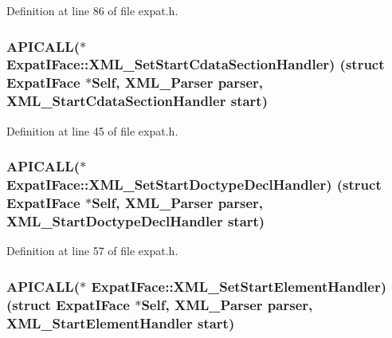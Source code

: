 Definition at line 86 of file expat.\+h.

\subsubsection[{\texorpdfstring{X\+M\+L\+\_\+\+Set\+Start\+Cdata\+Section\+Handler}{XML_SetStartCdataSectionHandler}}]{ A\+P\+I\+C\+A\+LL($\ast$ Expat\+I\+Face\+::\+X\+M\+L\+\_\+\+Set\+Start\+Cdata\+Section\+Handler) (struct {\bf Expat\+I\+Face} $\ast$Self, {\bf X\+M\+L\+\_\+\+Parser} parser, {\bf X\+M\+L\+\_\+\+Start\+Cdata\+Section\+Handler} {\bf start})}\hypertarget{struct_expat_i_face_ab7edb7f57f538b5cd33bcc54f123b1bc}{}\label{struct_expat_i_face_ab7edb7f57f538b5cd33bcc54f123b1bc}


Definition at line 45 of file expat.\+h.

\subsubsection[{\texorpdfstring{X\+M\+L\+\_\+\+Set\+Start\+Doctype\+Decl\+Handler}{XML_SetStartDoctypeDeclHandler}}]{ A\+P\+I\+C\+A\+LL($\ast$ Expat\+I\+Face\+::\+X\+M\+L\+\_\+\+Set\+Start\+Doctype\+Decl\+Handler) (struct {\bf Expat\+I\+Face} $\ast$Self, {\bf X\+M\+L\+\_\+\+Parser} parser, {\bf X\+M\+L\+\_\+\+Start\+Doctype\+Decl\+Handler} {\bf start})}\hypertarget{struct_expat_i_face_aa8ecbe4d524de83fdeb57a154a7eef3e}{}\label{struct_expat_i_face_aa8ecbe4d524de83fdeb57a154a7eef3e}


Definition at line 57 of file expat.\+h.

\subsubsection[{\texorpdfstring{X\+M\+L\+\_\+\+Set\+Start\+Element\+Handler}{XML_SetStartElementHandler}}]{ A\+P\+I\+C\+A\+LL($\ast$ Expat\+I\+Face\+::\+X\+M\+L\+\_\+\+Set\+Start\+Element\+Handler) (struct {\bf Expat\+I\+Face} $\ast$Self, {\bf X\+M\+L\+\_\+\+Parser} parser, {\bf X\+M\+L\+\_\+\+Start\+Element\+Handler} {\bf start})}\hypertarget{struct_expat_i_face_a2ba84418fd7ccb4fc933226db1006314}{}\label{struct_expat_i_face_a2ba84418fd7ccb4fc933226db1006314}


